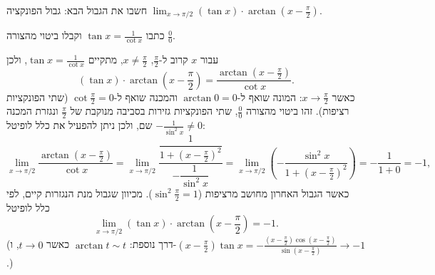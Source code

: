 
\begin{question}
חשבו את הגבול הבא:
גבול הפונקציה $\displaystyle \lim_{x\to\pi/2}(\tan x)\cdot\arctan\left(x-\frac{\pi}{2}\right)$.
\end{question}

\begin{hint}
כתבו $\tan x=\frac{1}{\cot x}$ וקבלו ביטוי מהצורה $\frac00$.
\end{hint}

\begin{solution}
עבור $x$ קרוב ל-$\frac\pi2$, $x\neq\frac\pi2$, מתקיים $\tan x=\frac{1}{\cot x}$, ולכן
\[ (\tan x)\cdot\arctan\left(x-\frac{\pi}{2}\right)=\frac{\arctan\left(x-\frac{\pi}{2}\right)}{\cot x}. \]
כאשר $x\to\frac\pi2$: המונה שואף ל-$\arctan 0=0$ והמכנה שואף ל-$\cot\frac\pi2=0$ (שתי הפונקציות רציפות). זהו ביטוי מהצורה $\frac00$, שתי הפונקציות גזירות בסביבה מנוקבת של $\frac\pi2$ ונגזרת המכנה $-\frac{1}{\sin^2x}\neq 0$ שם, ולכן ניתן להפעיל את כלל לופיטל:
\[ \lim_{x\to\pi/2}\frac{\arctan\left(x-\frac{\pi}{2}\right)}{\cot x}
   =\lim_{x\to\pi/2}\frac{\dfrac{1}{1+\left(x-\frac\pi2\right)^2}}{-\dfrac{1}{\sin^2x}}
   =\lim_{x\to\pi/2}\left(-\frac{\sin^2x}{1+\left(x-\frac\pi2\right)^2}\right)=-\frac{1}{1+0}=-1, \]
כאשר הגבול האחרון מחושב מרציפות ($\sin^2\frac\pi2=1$). מכיוון שגבול מנת הנגזרות קיים, לפי כלל לופיטל
\[ \lim_{x\to\pi/2}(\tan x)\cdot\arctan\left(x-\frac{\pi}{2}\right)=-1. \]
(דרך נוספת: $\arctan t\sim t$ כאשר $t\to0$, ו-$(x-\frac\pi2)\tan x=-\frac{(x-\frac\pi2)\cos(x-\frac\pi2)}{\sin(x-\frac\pi2)}\to-1$.)
\end{solution}
